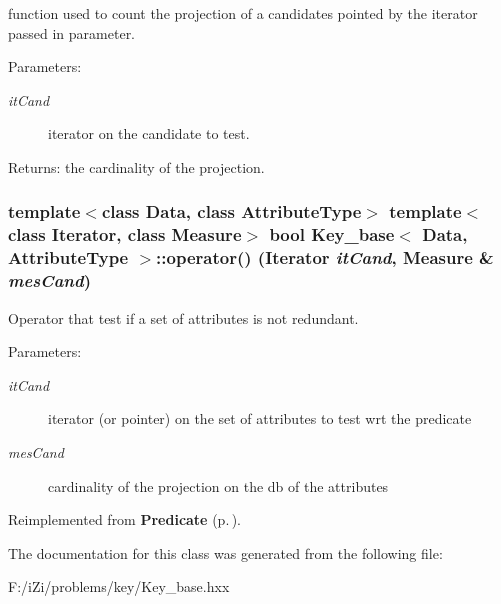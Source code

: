 function used to count the projection of a candidates pointed by the iterator passed in parameter. 

\begin{Desc}
\item[Parameters:]
\begin{description}
\item[{\em it\-Cand}]iterator on the candidate to test. \end{description}
\end{Desc}
\begin{Desc}
\item[Returns:]the cardinality of the projection. \end{Desc}
\subsubsection{\setlength{\rightskip}{0pt plus 5cm}template$<$class Data, class Attribute\-Type$>$ template$<$class Iterator, class Measure$>$ bool {\bf Key\_\-base}$<$ Data, Attribute\-Type $>$::operator() (Iterator {\em it\-Cand}, Measure \& {\em mes\-Cand})}\label{class_key__base_27f6933ca653e959cea1332231c1ee8a}


Operator that test if a set of attributes is not redundant. 

\begin{Desc}
\item[Parameters:]
\begin{description}
\item[{\em it\-Cand}]iterator (or pointer) on the set of attributes to test wrt the predicate \item[{\em mes\-Cand}]cardinality of the projection on the db of the attributes \end{description}
\end{Desc}


Reimplemented from {\bf Predicate} {\rm (p.\,\pageref{class_predicate_6fb1a75dba2268f75738f335f403e46c})}.

The documentation for this class was generated from the following file:\begin{CompactItemize}
\item 
F:/i\-Zi/problems/key/Key\_\-base.hxx\end{CompactItemize}
